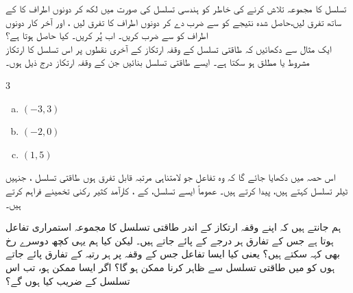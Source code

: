 تسلسل  کا مجموعہ تلاش کرنے کی خاطر  کو ہندسی تسلسل کی صورت میں لکھ کر دونوں اطراف کا  کے ساتھ تفرق لیں،حاصل شدہ  نتیجے  کو  سے ضرب دے کر دونوں اطراف کا تفرق لیں ، اور آخر کار دونوں اطراف کو  سے ضرب کریں۔ اب  پُر کریں۔ کیا حاصل ہوتا ہے؟
\\
ایک مثال سے دکھائیں کہ  طاقتی تسلسل کے وقفہ ارتکاز کے آخری نقطوں  پر اس تسلسل کا ارتکاز مشروط یا مطلق ہو سکتا ہے۔
ایسے طاقتی تسلسل بنائیں جن کے وقفہ ارتکاز درج ذیل ہوں۔
\begin{multicols}{3}
\begin{enumerate}[a.]
\item
$(-3,3)$
\item
$(-2,0)$
\item
$(1,5)$
\end{enumerate}
\end{multicols}




اس حصہ میں دکھایا جائے گا کہ وہ تفاعل جو لامتناہی  مرتبہ  قابل تفرق ہوں طاقتی تسلسل ، جنہیں ٹیلر تسلسل کہتے ہیں،  پیدا کرتے ہیں۔  عموماً ایسے تسلسل، کے ، کارآمد   کثیر رکنی  تخمینے     فراہم  کرتے ہیں۔

ہم جانتے ہیں کہ اپنے وقفہ ارتکاز کے اندر طاقتی تسلسل کا مجموعہ استمراری تفاعل ہوتا ہے جس کے تفارق  ہر درجے کے پائے جاتے ہیں۔ لیکن کیا ہم یہی کچھ دوسرے  رخ بھی کہہ سکتے ہیں؟ یعنی کیا ایسا تفاعل  جس کے وقفہ   پر ہر رتبہ کے تفارق پائے جاتے ہوں کو  میں طاقتی تسلسل سے ظاہر کرنا ممکن ہو گا؟ اگر ایسا ممکن ہو، تب اس تسلسل کے  ضریب  کیا ہوں گے؟

